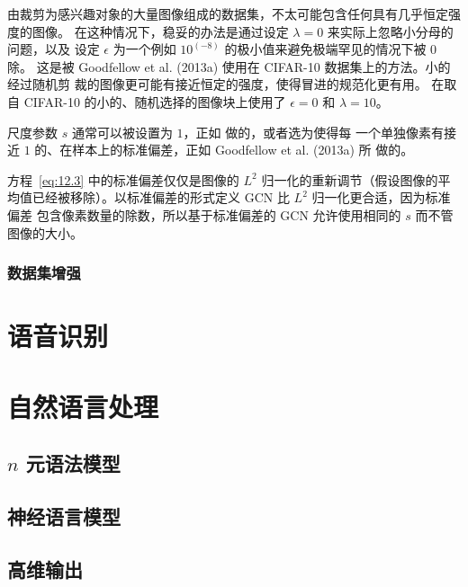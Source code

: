 由裁剪为感兴趣对象的大量图像组成的数据集，不太可能包含任何具有几乎恒定强度的图像。
在这种情况下，稳妥的办法是通过设定 $\lambda = 0$ 来实际上忽略小分母的问题，以及
设定 $\epsilon$ 为一个例如 $10^{(-8)}$ 的极小值来避免极端罕见的情况下被 $0$ 除。
这是被 Goodfellow et al. (2013a) 使用在 CIFAR-10 数据集上的方法。小的经过随机剪
裁的图像更可能有接近恒定的强度，使得冒进的规范化更有用。\citet{Coates2011} 在取
自 CIFAR-10 的小的、随机选择的图像块上使用了 $\epsilon = 0$ 和 $\lambda = 10$。

尺度参数 $s$ 通常可以被设置为 $1$，正如 \citet{Coates2011} 做的，或者选为使得每
一个单独像素有接近 $1$ 的、在样本上的标准偏差，正如 Goodfellow et al. (2013a) 所
做的。

方程~\ref{eq:12.3} 中的标准偏差仅仅是图像的 $L^2$ 归一化的重新调节（假设图像的平
  均值已经被移除）。以标准偏差的形式定义 GCN 比 $L^2$ 归一化更合适，因为标准偏差
包含像素数量的除数，所以基于标准偏差的 GCN 允许使用相同的 $s$ 而不管图像的大小。

\subsubsection{数据集增强}
\label{subsubsec:dataset_augmentation}

\section{语音识别}
\label{sec:speech_recognition}

\section{自然语言处理}
\label{sec:natural_language_processing}

\subsection{$n$ 元语法模型}
\label{subsec:ngrams}

\subsection{神经语言模型}
\label{subsec:neural_language_models}

\subsection{高维输出}
\label{high_dimentional_outputs}

